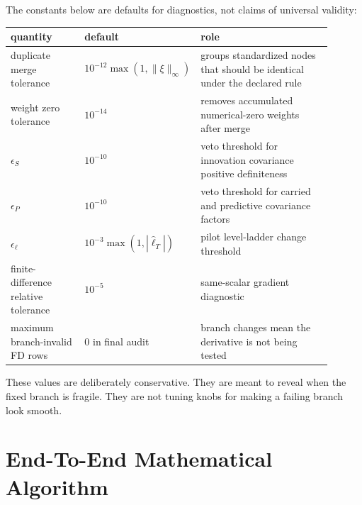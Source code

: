The constants below are defaults for diagnostics, not claims of universal
validity:
\begin{center}
\small
\begin{tabular}{p{0.24\linewidth}p{0.22\linewidth}p{0.44\linewidth}}
\toprule
quantity & default & role \\
\midrule
duplicate merge tolerance & \(10^{-12}\max(1,\|\xi\|_\infty)\) & groups standardized nodes that should be identical under the declared rule \\
weight zero tolerance & \(10^{-14}\) & removes accumulated numerical-zero weights after merge \\
\(\epsilon_S\) & \(10^{-10}\) & veto threshold for innovation covariance positive definiteness \\
\(\epsilon_P\) & \(10^{-10}\) & veto threshold for carried and predictive covariance factors \\
\(\epsilon_\ell\) & \(10^{-3}\max(1,|\widehat\ell_T|)\) & pilot level-ladder change threshold \\
finite-difference relative tolerance & \(10^{-5}\) & same-scalar gradient diagnostic \\
maximum branch-invalid FD rows & 0 in final audit & branch changes mean the derivative is not being tested \\
\bottomrule
\end{tabular}
\end{center}
These values are deliberately conservative.  They are meant to reveal when the
fixed branch is fragile.  They are not tuning knobs for making a failing branch
look smooth.

\section{End-To-End Mathematical Algorithm}
\label{sec:bf-hd-sgqf-end-to-end-algorithm}

